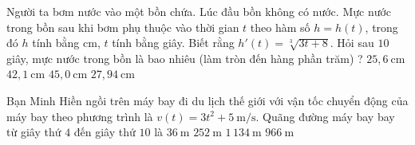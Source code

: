\begin{ex}%
	Người ta bơm nước vào một bồn chứa. Lúc đầu bồn không có nước. Mực nước trong bồn sau khi bơm phụ thuộc vào thời gian $t$ theo hàm số $h=h(t)$, trong đó $h$ tính bằng $\mathrm{cm}$, $t$ tính bằng giây. Biết rằng $h'(t)=\sqrt[3]{3t  + 8}$. Hỏi sau $10$ giây, mực nước trong bồn là bao nhiêu (làm tròn đến hàng phần trăm) ?
	\choice 
		{$25{,}6~\mathrm{cm}$} 
		 {$42{,}1~\mathrm{cm}$}
		 {$45{,}0~\mathrm{cm}$}
		{\True $27{,}94~\mathrm{cm}$} 
\end{ex}

\begin{ex}%
	Bạn Minh Hiền ngồi trên máy bay đi du lịch thế giới với vận tốc chuyển động của máy  bay theo phương trình là $v\left(t\right)=3{t^2}+5~\mathrm{m/s}$. Quãng đường máy bay bay từ giây thứ $4$ đến giây thứ $10$ là
	 \choice
		 {$36~\mathrm{m}$}
		 {$252~\mathrm{m}$}
		{$1\,134~\mathrm{m}$} 
		{\True  $966~\mathrm{m}$}
\end{ex}

